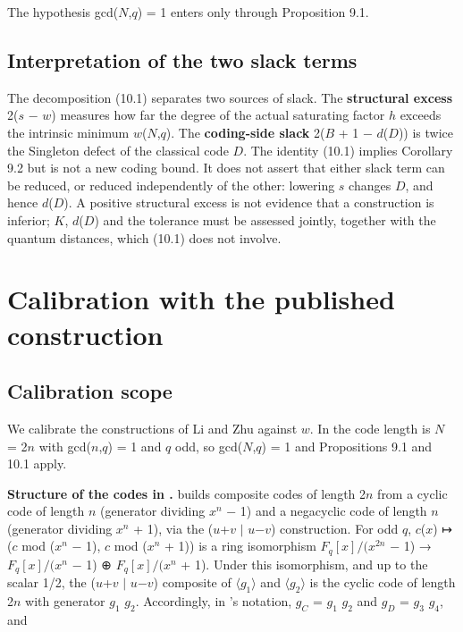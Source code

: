 \documentclass[pdflatex,sn-mathphys-num]{sn-jnl}
\theoremstyle{thmstyleone}
\theoremstyle{thmstylethree}
\begin{document}
The hypothesis gcd(\(N\),\(q\)) = 1 enters only through Proposition 9.1.

\subsection{Interpretation of the two slack terms}

The decomposition (10.1) separates two sources of slack. The \textbf{structural excess} 2(\(s\) − \(w\)) measures how far the degree of the actual saturating factor \(h\) exceeds the intrinsic minimum \(w\)(\(N\),\(q\)). The \textbf{coding-side slack} 2(\(B\) + 1 − \(d\)(\(D\))) is twice the Singleton defect of the classical code \(D\). The identity (10.1) implies Corollary 9.2 but is not a new coding bound. It does not assert that either slack term can be reduced, or reduced independently of the other: lowering \(s\) changes \(D\), and hence \(d\)(\(D\)). A positive structural excess is not evidence that a construction is inferior; \(K\), \(d\)(\(D\)) and the tolerance must be assessed jointly, together with the quantum distances, which (10.1) does not involve.

\section{Calibration with the published construction}

\subsection{Calibration scope}

We calibrate the constructions of Li and Zhu \cite{LZ22} against \(w\). In \cite{LZ22} the code length is \(N\) = 2\(n\) with gcd(\(n\),\(q\)) = 1 and \(q\) odd, so gcd(\(N\),\(q\)) = 1 and Propositions 9.1 and 10.1 apply.

\textbf{Structure of the codes in \cite{LZ22}.} \cite{LZ22} builds composite codes of length 2\(n\) from a cyclic code of length \(n\) (generator dividing \(x^n\) − 1) and a negacyclic code of length \(n\) (generator dividing \(x^n\) + 1), via the (\(u\)+\(v\) \(\mid\) \(u\)−\(v\)) construction. For odd \(q\), \(c\)(\(x\)) ↦ (\(c\) mod (\(x^n\) − 1), \(c\) mod (\(x^n\) + 1)) is a ring isomorphism \(F_q[x]/(x^{2n}\) − 1) → \(F_q[x]/(x^n\) − 1) ⊕ \(F_q[x]/(x^n\) + 1). Under this isomorphism, and up to the scalar 1/2, the (\(u\)+\(v\) \(\mid\) \(u\)−\(v\)) composite of \(⟨g_1⟩\) and \(⟨g_2⟩\) is the cyclic code of length 2\(n\) with generator \(g_1\) \(g_2\). Accordingly, in \cite{LZ22}'s notation, \(g_C\) = \(g_1\) \(g_2\) and \(g_D\) = \(g_3\) \(g_4\), and
\end{document}
